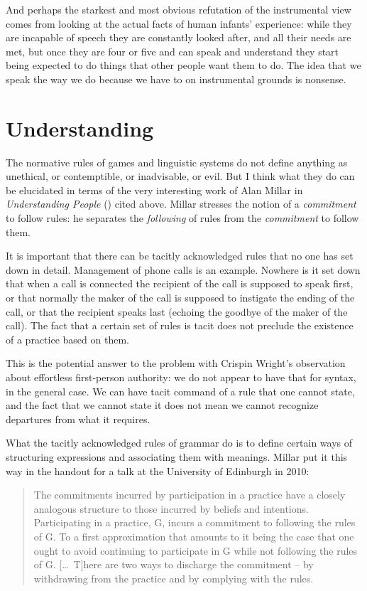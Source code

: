 \documentclass[output=paper]{langscibook}
\begin{document}
And perhaps the starkest and most obvious refutation of the instrumental view comes from looking at the actual facts of human infants' experience: while they are incapable of speech they are constantly looked after, and all their needs are met, but once they are four or five and can speak and understand they start being expected to do things that other people want them to do. The idea that we speak the way we do because we have to on instrumental grounds is nonsense.

\section{Understanding}
\label{sec:pullum:understanding}

The normative rules of games and linguistic systems do not define anything as unethical, or contemptible, or inadvisable, or evil.  But I think what they do can be elucidated in terms of the very interesting work of Alan Millar in \textit{Understanding People} (\citeyear{Millar04}) cited above. Millar stresses the notion of a \emph{commitment} to follow rules: he separates the \emph{following} of rules from the \emph{commitment} to follow them.

It is important that there can be tacitly acknowledged rules that no one has set down in detail. Management of phone calls is an example. Nowhere is it set down that when a call is connected the recipient of the call is supposed to speak first, or that normally the maker of the call is supposed to instigate the ending of the call, or that the recipient speaks last (echoing the goodbye of the maker of the call). The fact that a certain set of rules is tacit does not preclude the existence of a practice based on them.

This is the potential answer to the problem with Crispin Wright's observation about effortless first-person authority: we do not appear to have that for syntax, in the general case.  We can have tacit command of a rule that one cannot state, and the fact that we cannot state it does not mean we cannot recognize departures from what it requires.

What the tacitly acknowledged rules of grammar do is to define certain ways of structuring expressions and associating them with meanings. Millar put it this way in the handout for a talk at the University of Edinburgh in 2010:

\begin{quote}
The commitments incurred by participation in a practice have a closely analogous structure to those incurred by beliefs and intentions. Participating in a practice, G, incurs a commitment to following the rules of G.  To a first approximation that amounts to it being the case that one ought to avoid continuing to participate in G while not following the rules of G.  [\ldots\ T]here are two ways to discharge the commitment -- by withdrawing from the practice and by complying with the rules. \end{quote} 
\end{document}
